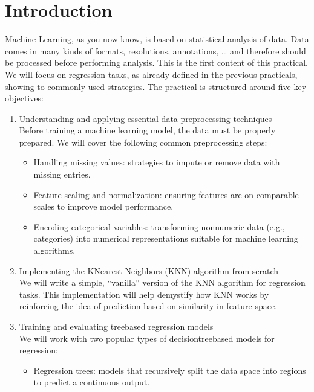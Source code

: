 \documentclass[letterpaper,10pt,english]{jupyterBook}
\begin{document}
\section{Introduction}
\label{\detokenize{03:introduction}}
\sphinxAtStartPar
Machine Learning, as you now know, is based on statistical analysis of data. Data comes in many kinds of formats, resolutions, annotations, … and therefore should be processed before performing analysis. This is the first content of this practical. We will focus on regression tasks, as already defined in the previous practicals, showing to commonly used strategies. The practical is structured around five key objectives:
\begin{enumerate}
%
\item {} 
\sphinxAtStartPar
Understanding and applying essential data preprocessing techniques\\
Before training a machine learning model, the data must be properly prepared. We will cover the following common preprocessing steps:
\begin{itemize}
\item {} 
\sphinxAtStartPar
Handling missing values: strategies to impute or remove data with missing entries.

\item {} 
\sphinxAtStartPar
Feature scaling and normalization: ensuring features are on comparable scales to improve model performance.

\item {} 
\sphinxAtStartPar
Encoding categorical variables: transforming non\sphinxhyphen{}numeric data (e.g., categories) into numerical representations suitable for machine learning algorithms.

\end{itemize}

\item {} 
\sphinxAtStartPar
Implementing the K\sphinxhyphen{}Nearest Neighbors (KNN) algorithm from scratch\\
We will write a simple, “vanilla” version of the KNN algorithm for regression tasks. This implementation will help demystify how KNN works by reinforcing the idea of prediction based on similarity in feature space.

\item {} 
\sphinxAtStartPar
Training and evaluating tree\sphinxhyphen{}based regression models\\
We will work with two popular types of decision\sphinxhyphen{}tree\sphinxhyphen{}based models for regression:
\begin{itemize}
\item {} 
\sphinxAtStartPar
Regression trees: models that recursively split the data space into regions to predict a continuous output.


\end{itemize}
\end{enumerate}
\end{document}
